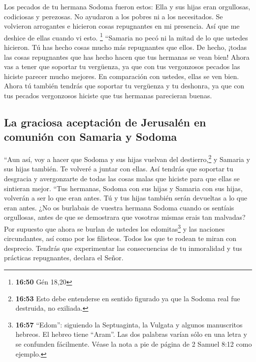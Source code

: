  Los pecados de tu hermana Sodoma fueron estos: Ella y
sus hijas eran orgullosas, codiciosas y perezosas. No ayudaron a los
pobres ni a los necesitados.  Se volvieron arrogantes e
hicieron cosas repugnantes en mi presencia. Así que me deshice de ellas
cuando vi esto. \footnote{\textbf{16:50} Gén 18,20} 
``Samaria no pecó ni la mitad de lo que ustedes hicieron. Tú has hecho
cosas mucho más repugnantes que ellos. De hecho, ¡todas las cosas
repugnantes que has hecho hacen que tus hermanas se vean bien!
 Ahora vas a tener que soportar tu vergüenza, ya que con
tus vergonzosos pecados las hiciste parecer mucho mejores. En
comparación con ustedes, ellas se ven bien. Ahora tú también tendrás que
soportar tu vergüenza y tu deshonra, ya que con tus pecados vergonzosos
hiciste que tus hermanas parecieran buenas.

\hypertarget{la-graciosa-aceptaciuxf3n-de-jerusaluxe9n-en-comuniuxf3n-con-samaria-y-sodoma}{%
\subsection{La graciosa aceptación de Jerusalén en comunión con Samaria
y
Sodoma}\label{la-graciosa-aceptaciuxf3n-de-jerusaluxe9n-en-comuniuxf3n-con-samaria-y-sodoma}}

 ``Aun así, voy a hacer que Sodoma y sus hijas vuelvan
del destierro,\footnote{\textbf{16:53} Esto debe entenderse en sentido
  figurado ya que la Sodoma real fue destruida, no exiliada.} y Samaria
y sus hijas también. Te volveré a juntar con ellas.  Así
tendrás que soportar tu desgracia y avergonzarte de todas las cosas
malas que hiciste para que ellas se sintieran mejor. 
``Tus hermanas, Sodoma con sus hijas y Samaria con sus hijas, volverán a
ser lo que eran antes. Tú y tus hijas también serán devueltas a lo que
eran antes.  ¿No os burlabais de vuestra hermana Sodoma
cuando os sentíais orgullosas,  antes de que se
demostrara que vosotras mismas erais tan malvadas? Por supuesto que
ahora se burlan de ustedes los edomitas\footnote{\textbf{16:57}
  ``Edom'': siguiendo la Septuaginta, la Vulgata y algunos manuscritos
  hebreos. El hebreo tiene ``Aram''. Las dos palabras varían sólo en una
  letra y se confunden fácilmente. Véase la nota a pie de página de 2
  Samuel 8:12 como ejemplo.} y las naciones circundantes, así como por
los filisteos. Todos los que te rodean te miran con desprecio.
 Tendrás que experimentar las consecuencias de tu
inmoralidad y tus prácticas repugnantes, declara el Señor.

